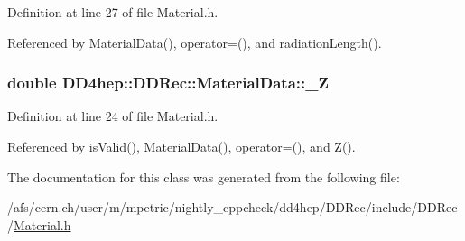Definition at line 27 of file Material.h.

Referenced by MaterialData(), operator=(), and radiationLength().\hypertarget{class_d_d4hep_1_1_d_d_rec_1_1_material_data_acf48e4405aaa58e1255d41e49c0c956a}{
\subsubsection[{\_\-Z}]{\setlength{\rightskip}{0pt plus 5cm}double {\bf DD4hep::DDRec::MaterialData::\_\-Z}}}
\label{class_d_d4hep_1_1_d_d_rec_1_1_material_data_acf48e4405aaa58e1255d41e49c0c956a}


Definition at line 24 of file Material.h.

Referenced by isValid(), MaterialData(), operator=(), and Z().

The documentation for this class was generated from the following file:\begin{DoxyCompactItemize}
\item 
/afs/cern.ch/user/m/mpetric/nightly\_\-cppcheck/dd4hep/DDRec/include/DDRec/\hyperlink{_material_8h}{Material.h}\end{DoxyCompactItemize}
